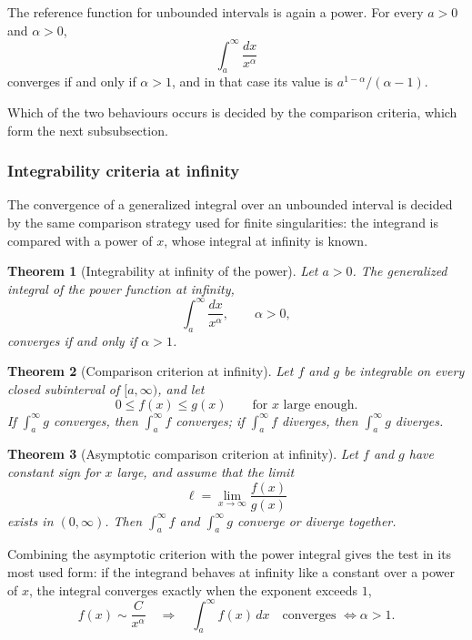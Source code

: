 \documentclass[11pt,a4paper]{article}
\theoremstyle{definition} \newtheorem{definition}{Definition} \theoremstyle{plain} \newtheorem{theorem}{Theorem}
\begin{document}
The reference function for unbounded intervals is again a power.  For every
$a>0$ and $\alpha>0$,
\[
\int_a^{\infty} \frac{dx}{x^{\alpha}}
\]
converges if and only if $\alpha>1$, and in that case its value is
$a^{1-\alpha}/(\alpha-1)$.

Which of the two behaviours occurs is decided by the comparison criteria,
which form the next subsubsection.

\subsubsection{Integrability criteria at infinity}

The convergence of a generalized integral over an unbounded interval is
decided by the same comparison strategy used for finite singularities: the
integrand is compared with a power of $x$, whose integral at infinity is
known.

\begin{theorem}[Integrability at infinity of the power]\label{thm:power-infinity}
Let $a>0$.  The generalized integral of the power function at infinity,
\[
\int_a^{\infty} \frac{dx}{x^{\alpha}},
\qquad \alpha>0,
\]
converges if and only if $\alpha>1$.
\end{theorem}

\begin{theorem}[Comparison criterion at infinity]\label{thm:comparison-infinity}
Let $f$ and $g$ be integrable on every closed subinterval of $[a,\infty)$, and
let
\[
0 \le f(x) \le g(x) \qquad \text{for } x \text{ large enough}.
\]
If $\int_a^{\infty} g$ converges, then $\int_a^{\infty} f$ converges; if
$\int_a^{\infty} f$ diverges, then $\int_a^{\infty} g$ diverges.
\end{theorem}

\begin{theorem}[Asymptotic comparison criterion at infinity]\label{thm:asymptotic-comparison-infinity}
Let $f$ and $g$ have constant sign for $x$ large, and assume that the limit
\[
\ell = \lim_{x\to\infty}\frac{f(x)}{g(x)}
\]
exists in $(0,\infty)$.  Then $\int_a^{\infty} f$ and $\int_a^{\infty} g$
converge or diverge together.
\end{theorem}

Combining the asymptotic criterion with the power integral gives the test in
its most used form: if the integrand behaves at infinity like a constant over
a power of $x$, the integral converges exactly when the exponent exceeds $1$,
\[
f(x)\sim\frac{C}{x^{\alpha}}
\quad\Longrightarrow\quad
\int_a^{\infty} f(x)\,dx
\quad\text{converges } \iff \alpha>1.
\]
\end{document}
